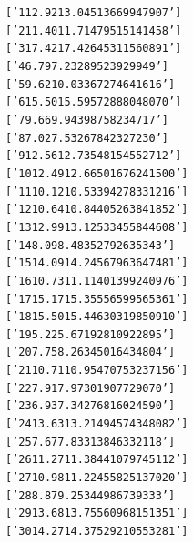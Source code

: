 \documentclass[letterpaper,10pt,english]{/usr/local/lib/python2.7/dist-packages/sphinx/texinputs/sphinxhowto}
\newenvironment{InvisibleVerbatim}
        {\begin{mdframed}[leftmargin=0.1\linewidth,innerleftmargin=3pt,innerrightmargin=3pt, userdefinedwidth=1\linewidth, linewidth=0pt, linecolor=white, usetwoside=false]}
        {\end{mdframed}}
\begin{document}
    

        
        

            
                \begin{InvisibleVerbatim}
                \vspace{-0.5\baselineskip}
\begin{alltt}['1         12.92           13.04            5136699   47907']
['2         11.40           11.71            4795151   41458']
['3         17.42           17.42            6453115   60891']
['4          6.79            7.23            2895239   29949']
['5          9.62           10.03            3672746   41616']
['6         15.50           15.59            5728880   48070']
['7          9.66            9.94            3987582   34717']
['8          7.02            7.53            2678423   27230']
['9         12.56           12.73            5481545   52712']
['10        12.49           12.66            5016762   41500']
['11        10.12           10.53            3942783   31216']
['12        10.64           10.84            4052638   41852']
['13        12.99           13.12            5334558   44608']
['14         8.09            8.48            3527926   35343']
['15        14.09           14.24            5679636   47481']
['16        10.73           11.11            4013992   40976']
['17        15.17           15.35            5565995   65361']
['18        15.50           15.44            6303198   50910']
['19         5.22            5.67            1928109   22895']
['20         7.75            8.26            3450164   34804']
['21        10.71           10.95            4707532   37156']
['22         7.91            7.97            3019077   29070']
['23         6.93            7.34            2768160   24590']
['24        13.63           13.21            4945743   48082']
['25         7.67            7.83            3138463   32118']
['26        11.27           11.38            4410797   45112']
['27        10.98           11.22            4558251   37020']
['28         8.87            9.25            3449867   39333']
['29        13.68           13.75            5609681   51351']
['30        14.27           14.37            5292105   53281']
\end{alltt}

            \end{InvisibleVerbatim}
            
\end{document}
